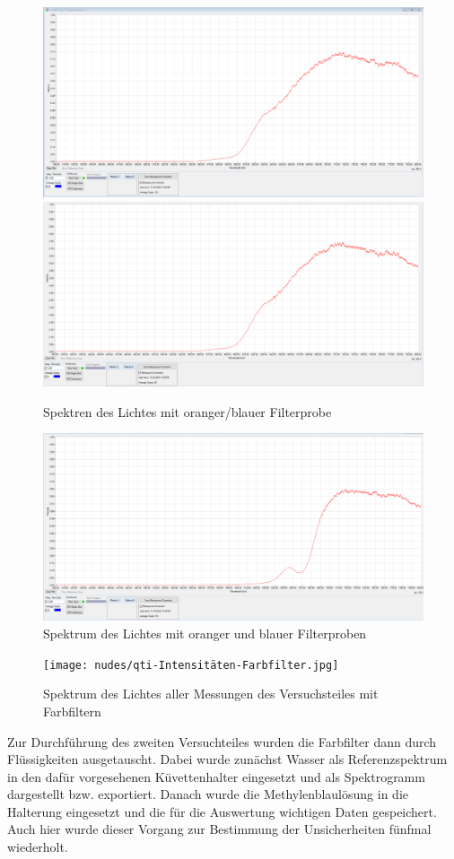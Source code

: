 \documentclass[12pt,a4paper,twoside]{article}
\begin{document}
\begin{figure}[H]
    \centering
    \includegraphics[width=0.4\linewidth]{nudes/Verlauf-Rot.PNG}
    \includegraphics[width=0.4\linewidth]{nudes/Verlauf-Blau.PNG}
    \caption{Spektren des Lichtes mit oranger/blauer Filterprobe}
    \label{fig:Orange/Blau3.1Bilder}
\end{figure}

\begin{figure}[H]
    \centering
    \includegraphics[width=0.4\linewidth]{nudes/Verlauf-BlauUndRot.PNG}
    \caption{Spektrum des Lichtes mit oranger und blauer Filterproben}
    \label{fig:OrangeUndBlau3.1Bilder}
\end{figure}

\begin{figure}[H]
    \centering
    \texttt{[image: nudes/qti-Intensitäten-Farbfilter.jpg]}
    \caption{Spektrum des Lichtes aller Messungen des Versuchsteiles mit Farbfiltern}
    \label{fig:Alle3.1Bilder}
\end{figure}

\noindent
Zur Durchführung des zweiten Versuchteiles wurden die Farbfilter dann durch Flüssigkeiten ausgetauscht. Dabei wurde zunächst Wasser als Referenzspektrum in den dafür vorgesehenen Küvettenhalter eingesetzt und als Spektrogramm dargestellt bzw. exportiert.
Danach wurde die Methylenblaulösung in die Halterung eingesetzt und die für die Auswertung wichtigen Daten gespeichert. Auch hier wurde dieser Vorgang zur Bestimmung der Unsicherheiten fünfmal wiederholt. \newline
\end{document}
